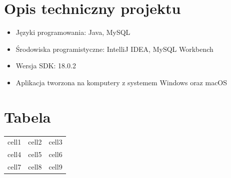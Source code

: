 \documentclass[12pt, letterpaper]{article}
\begin{document}
\section{Opis techniczny projektu}
\begin{itemize}
\item Języki programowania: Java, MySQL
\item Środowiska programistyczne: IntelliJ IDEA, MySQL Workbench
\item Wersja SDK: 18.0.2
\item Aplikacja tworzona na komputery z systemem Windows oraz macOS
\end{itemize}

\section{Tabela}

\begin{center}
\begin{tabular}{|c|c|c|}
\hline
cell1 & cell2 & cell3 \\
cell4 & cell5 & cell6 \\
cell7 & cell8 & cell9 \\
\hline
\end{tabular}
\end{center}
\end{document}
